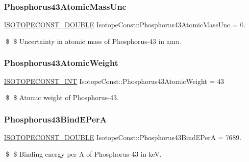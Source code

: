 \subsubsection{\texorpdfstring{Phosphorus43\+Atomic\+Mass\+Unc}{Phosphorus43AtomicMassUnc}}
{\footnotesize\ttfamily \mbox{\hyperlink{group___isotope_const-_macros_ga8f45a7272ce02c0b4c65c44636ed719a}{I\+S\+O\+T\+O\+P\+E\+C\+O\+N\+S\+T\+\_\+\+D\+O\+U\+B\+LE}} Isotope\+Const\+::\+Phosphorus43\+Atomic\+Mass\+Unc = 0.}

\$ \$ Uncertainty in atomic mass of Phosphorus-\/43 in amu. \mbox{\label{group___isotope_const-_phosphorus-_p43_gab01a77dc835048bef7e989b3dec96068}} 
\subsubsection{\texorpdfstring{Phosphorus43\+Atomic\+Weight}{Phosphorus43AtomicWeight}}
{\footnotesize\ttfamily \mbox{\hyperlink{group___isotope_const-_macros_ga5f18360b3e99483a35c32d789e62621c}{I\+S\+O\+T\+O\+P\+E\+C\+O\+N\+S\+T\+\_\+\+I\+NT}} Isotope\+Const\+::\+Phosphorus43\+Atomic\+Weight = 43}

\$ \$ Atomic weight of Phosphorus-\/43. \mbox{\label{group___isotope_const-_phosphorus-_p43_ga2da0ae5511a4ab09d9b931133fea6e81}} 
\subsubsection{\texorpdfstring{Phosphorus43\+Bind\+E\+PerA}{Phosphorus43BindEPerA}}
{\footnotesize\ttfamily \mbox{\hyperlink{group___isotope_const-_macros_ga8f45a7272ce02c0b4c65c44636ed719a}{I\+S\+O\+T\+O\+P\+E\+C\+O\+N\+S\+T\+\_\+\+D\+O\+U\+B\+LE}} Isotope\+Const\+::\+Phosphorus43\+Bind\+E\+PerA = 7689.}

\$ \$ Binding energy per A of Phosphorus-\/43 in keV. \mbox{\label{group___isotope_const-_phosphorus-_p43_ga454257086359b0778d6ff1012fdf2665}} 
